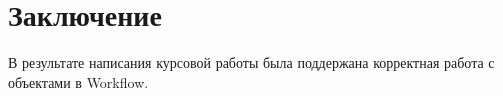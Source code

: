 \section{Заключение}
В результате написания курсовой работы была поддержана корректная работа с объектами в Workflow.